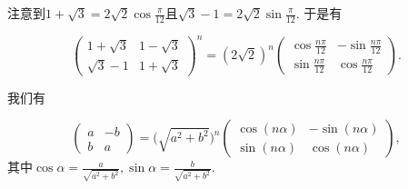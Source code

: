 \begin{solution}
  \begin{enuma}
    \item 注意到$1+\sqrt3=2\sqrt2\cos\frac\pi{12}$且$\sqrt3-1=
        2\sqrt2\sin\frac\pi{12}$. 于是有
  \end{enuma}
  \[
    \begin{pmatrix}
      1 + \sqrt3 & 1 - \sqrt3 \\
      \sqrt3 - 1 & 1 + \sqrt3
    \end{pmatrix}^n = (2\sqrt2)^n \begin{pmatrix}
      \cos\frac{n\pi}{12} & - \sin\frac{n\pi}{12}\\
      \sin\frac{n\pi}{12} & \cos\frac{n\pi}{12}
    \end{pmatrix}.
  \]
  \begin{enuma}\setcounter{enumi}{1}
    \item 我们有
  \end{enuma}
  \[
    \begin{pmatrix}
      a & -b \\
      b & a
    \end{pmatrix} = \Big(\sqrt{a^2+b^2}\Big)^n
      \begin{pmatrix}
        \cos(n\alpha) & -\sin(n\alpha) \\
        \sin(n\alpha) & \cos(n\alpha)
      \end{pmatrix},
  \]
  其中$\cos\alpha=\frac a{\sqrt{a^2+b^2}},\sin\alpha=
  \frac b{\sqrt{a^2+b^2}}$.
\end{solution}

